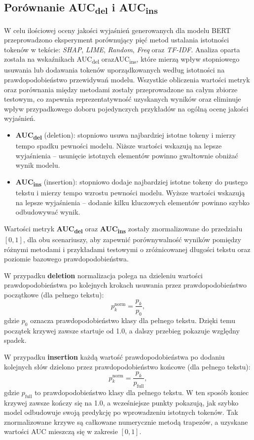 \documentclass[wmii, inf, mgr]{uwmthesis}
\begin{document}
\subsection{Porównanie AUC\textsubscript{del} i AUC\textsubscript{ins}}
W celu ilościowej oceny jakości wyjaśnień generowanych dla modelu BERT przeprowadzono eksperyment porównujący pięć metod ustalania istotności tokenów w tekście: \textit{SHAP}, \textit{LIME}, \textit{Random}, \textit{Freq} oraz \textit{TF-IDF}. Analiza oparta została na wskaźnikach AUC\textsubscript{del} orazAUC\textsubscript{ins}, które mierzą wpływ stopniowego usuwania lub dodawania tokenów uporządkowanych według istotności na prawdopodobieństwo przewidywań modelu. Wszystkie obliczenia wartości metryk oraz porównania między metodami zostały przeprowadzone na całym zbiorze testowym, co zapewnia reprezentatywność uzyskanych wyników oraz eliminuje wpływ przypadkowego doboru pojedynczych przykładów na ogólną ocenę jakości wyjaśnień.

\begin{itemize}
	\item \textbf{AUC\textsubscript{del}} (deletion): stopniowo usuwa najbardziej istotne tokeny i mierzy tempo spadku pewności modelu. Niższe wartości wskazują na lepsze wyjaśnienia -- usunięcie istotnych elementów powinno gwałtownie obniżać wynik modelu.
	\item \textbf{AUC\textsubscript{ins}} (insertion): stopniowo dodaje najbardziej istotne tokeny do pustego tekstu i mierzy tempo wzrostu pewności modelu. Wyższe wartości wskazują na lepsze wyjaśnienia -- dodanie kilku kluczowych elementów powinno szybko odbudowywać wynik.
\end{itemize}

Wartości metryk \textbf{AUC\textsubscript{del}} oraz \textbf{AUC\textsubscript{ins}} zostały
znormalizowane do przedziału $[0,1]$, dla obu scenariuszy, aby zapewnić porównywalność wyników pomiędzy różnymi metodami i przykładami testowymi o zróżnicowanej długości tekstu oraz poziomie bazowego prawdopodobieństwa. 

W przypadku \textbf{deletion} normalizacja polega na dzieleniu wartości prawdopodobieństwa 
po kolejnych krokach usuwania przez prawdopodobieństwo początkowe (dla pełnego tekstu):
\[
p_k^{\text{norm}} = \frac{p_k}{p_0},
\]
gdzie $p_0$ oznacza prawdopodobieństwo klasy dla pełnego tekstu. Dzięki temu początek krzywej zawsze startuje od 1.0, a dalszy przebieg pokazuje względny spadek.

W przypadku \textbf{insertion} każdą wartość prawdopodobieństwa po dodaniu kolejnych słów 
dzielono przez prawdopodobieństwo końcowe (dla pełnego tekstu):
\[
p_k^{\text{norm}} = \frac{p_k}{p_{\text{full}}},
\]
gdzie $p_{\text{full}}$ to prawdopodobieństwo klasy dla pełnego tekstu. W ten sposób koniec krzywej zawsze kończy się na 1.0, a wcześniejsze punkty pokazują, jak szybko model odbudowuje swoją predykcję po wprowadzeniu istotnych tokenów. Tak znormalizowane krzywe są całkowane numerycznie metodą trapezów, a uzyskane wartości AUC mieszczą się w zakresie $[0,1]$. 
\end{document}
